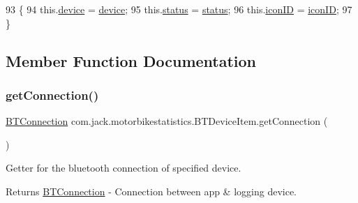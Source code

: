 \begin{DoxyCode}
93     \{
94         this.\hyperlink{classcom_1_1jack_1_1motorbikestatistics_1_1_b_t_device_item_acd943b008d77dcb5d72f8a65fa4986b9}{device} = \hyperlink{classcom_1_1jack_1_1motorbikestatistics_1_1_b_t_device_item_acd943b008d77dcb5d72f8a65fa4986b9}{device};
95         this.\hyperlink{classcom_1_1jack_1_1motorbikestatistics_1_1_b_t_device_item_ae7a8756973644c5719d5faddf3fa7946}{status} = \hyperlink{classcom_1_1jack_1_1motorbikestatistics_1_1_b_t_device_item_ae7a8756973644c5719d5faddf3fa7946}{status};
96         this.\hyperlink{classcom_1_1jack_1_1motorbikestatistics_1_1_b_t_device_item_a77f7a3c228f87fa5e946fe77b310f805}{iconID} = \hyperlink{classcom_1_1jack_1_1motorbikestatistics_1_1_b_t_device_item_a77f7a3c228f87fa5e946fe77b310f805}{iconID};
97     \}
\end{DoxyCode}


\subsection{Member Function Documentation}
\mbox{\label{classcom_1_1jack_1_1motorbikestatistics_1_1_b_t_device_item_ac3fbff10e5a5b3142ef648bf186b9be0}} 
\subsubsection{\texorpdfstring{get\+Connection()}{getConnection()}}
{\footnotesize\ttfamily \hyperlink{classcom_1_1jack_1_1motorbikestatistics_1_1_b_t_connection}{B\+T\+Connection} com.\+jack.\+motorbikestatistics.\+B\+T\+Device\+Item.\+get\+Connection (\begin{DoxyParamCaption}{ }\end{DoxyParamCaption})\hspace{0.3cm}{\ttfamily [inline]}}



Getter for the bluetooth connection of specified device. 

\begin{DoxyReturn}{Returns}
\hyperlink{classcom_1_1jack_1_1motorbikestatistics_1_1_b_t_connection}{B\+T\+Connection} -\/ Connection between app \& logging device. 
\end{DoxyReturn}



